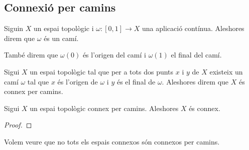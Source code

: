 \documentclass[../Apunts.tex]{subfiles}
\begin{document}
	\subsection{Connexió per camins}
	\begin{definition}[Camí]
		\label{de:camí}
		\label{def:orígen d'un camí}
		\label{def:final d'un camí}
		Siguin \(X\) un espai topològic i \(\omega\colon[0,1]\longrightarrow X\) una aplicació contínua. Aleshores direm que \(\omega\) és un camí.
		
		També direm que \(\omega(0)\) és l'origen del camí i \(\omega(1)\) el final del camí.
	\end{definition}
	\begin{definition}
		\label{connexió per camins}\label{def:connexió per camins}
		Sigui \(X\) un espai topològic tal que per a tots dos punts \(x\) i \(y\) de \(X\) existeix un camí \(\omega\) tal que \(x\) és l'origen de \(\omega\) i \(y\) és el final de \(\omega\). Aleshores direm que \(X\) és connex per camins.
	\end{definition}
	\begin{proposition}
		\label{prop:els connexos per camins són connexos}
		Sigui \(X\) un espai topològic connex per camins. Aleshores \(X\) és connex.
		\begin{proof}
		\end{proof}
	\end{proposition}
	\begin{example}
		\label{ex:no tots els espais connexos són connexos per camins}
		Volem veure que no tots els espais connexos són connexos per camins.
		\begin{solution}
		\end{solution}
	\end{example}
\end{document}
